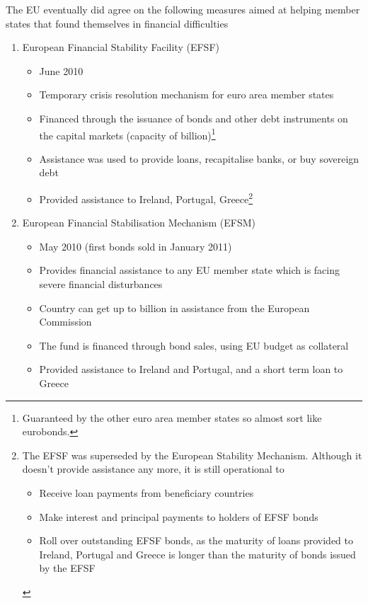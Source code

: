 \documentclass{tufte-handout}
\begin{document}
The EU eventually did agree on the following measures aimed at helping member states that found themselves in financial difficulties
\begin{enumerate}
  \item European Financial Stability Facility (EFSF)
  \begin{itemize}
    \item June 2010
    \item Temporary crisis resolution mechanism for euro area member states
    \item Financed through the issuance of bonds and other debt instruments on the capital markets (capacity of  billion)\footnote{Guaranteed by the other euro area member states so almost sort like eurobonds.}
    \item Assistance was used to provide loans, recapitalise banks, or buy sovereign debt    
    \item Provided assistance to Ireland, Portugal, Greece\footnote{The EFSF was superseded by the European Stability Mechanism. Although it doesn't provide assistance any more, it is still operational to \begin{itemize}
    \item Receive loan payments from beneficiary countries
    \item Make interest and principal payments to holders of EFSF bonds
    \item Roll over outstanding EFSF bonds, as the maturity of loans provided to Ireland, Portugal and Greece is longer than the maturity of bonds issued by the EFSF
  \end{itemize}}
  \end{itemize}
  \item European Financial Stabilisation Mechanism (EFSM)
  \begin{itemize}
    \item May 2010 (first bonds sold in January 2011)
    \item Provides financial assistance to any EU member state which is facing severe financial disturbances
    \item Country can get up to  billion in assistance from the European Commission
    \item The fund is financed through  bond sales, using EU budget as collateral    
    \item Provided assistance to Ireland and Portugal, and a short term loan to Greece
  \end{itemize}
\end{enumerate}
\end{document}
